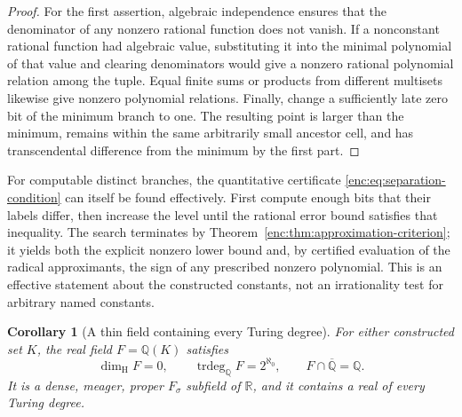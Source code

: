 \documentclass[11pt,a4paper]{article}
\newtheorem{corollary}[theorem]{Corollary}
\theoremstyle{definition}
\theoremstyle{remark}
\numberwithin{equation}{section}
\begin{document}
\begin{proof}
For the first assertion, algebraic independence ensures that the
denominator of any nonzero rational function does not vanish.  If a
nonconstant rational function had algebraic value, substituting it into
the minimal polynomial of that value and clearing denominators would
give a nonzero rational polynomial relation among the tuple.
Equal finite sums or products from different multisets likewise give
nonzero polynomial relations.  Finally, change a sufficiently late zero
bit of the minimum branch to one.  The resulting point is larger than
the minimum, remains within the same arbitrarily small ancestor cell,
and has transcendental difference from the minimum by the first part.
\end{proof}

For computable distinct branches, the quantitative certificate
\eqref{enc:eq:separation-condition} can itself be found effectively.  First
compute enough bits that their labels differ, then increase the level
until the rational error bound satisfies that inequality.  The search
terminates by Theorem~\ref{enc:thm:approximation-criterion}; it yields both
the explicit nonzero lower bound and, by certified evaluation of the
radical approximants, the sign of any prescribed nonzero polynomial.
This is an effective statement about the constructed constants, not an
irrationality test for arbitrary named constants.

\begin{corollary}[A thin field containing every Turing degree]
\label{enc:cor:thin-field}
For either constructed set $K$, the real field $F=\mathbb Q(K)$ satisfies
\[
 \dim_{\mathrm H}F=0,\qquad
 \operatorname{trdeg}_{\mathbb Q}F=2^{\aleph_0},\qquad
 F\cap\overline{\mathbb Q}=\mathbb Q.
\]
It is a dense, meager, proper $F_\sigma$ subfield of $\mathbb R$, and it contains a real of
every Turing degree.
\end{corollary}
\end{document}
